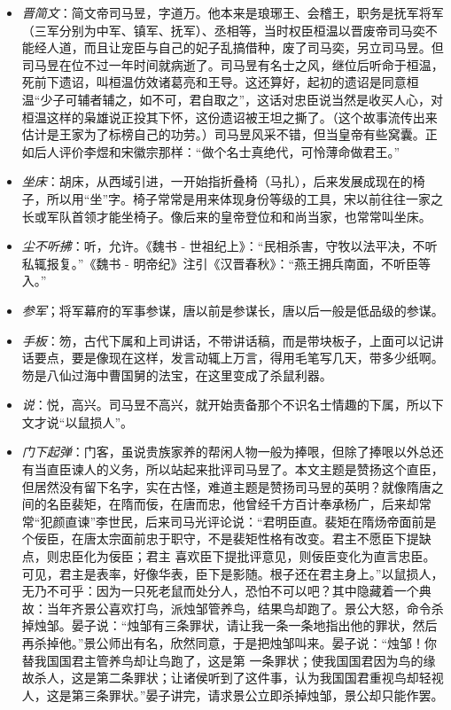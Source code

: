 \documentclass[]{book}
\providecommand{\tightlist}{%
  \setlength{\itemsep}{0pt}\setlength{\parskip}{0pt}}
\begin{document}
\begin{itemize}
\tightlist
\item
  \emph{晋简文}：简文帝司马昱，字道万。他本来是琅琊王、会稽王，职务是抚军将军（三军分别为中军、镇军、抚军）、丞相等，当时权臣桓温以晋废帝司马奕不能经人道，而且让宠臣与自己的妃子乱搞借种，废了司马奕，另立司马昱。但司马昱在位不过一年时间就病逝了。司马昱有名士之风，继位后听命于桓温，死前下遗诏，叫桓温仿效诸葛亮和王导。这还算好，起初的遗诏是同意桓温``少子可辅者辅之，如不可，君自取之''，这话对忠臣说当然是收买人心，对桓温这样的枭雄说正投其下怀，这份遗诏被王坦之撕了。（这个故事流传出来估计是王家为了标榜自己的功劳。）司马昱风采不错，但当皇帝有些窝囊。正如后人评价李煜和宋徽宗那样：``做个名士真绝代，可怜薄命做君王。''
\item
  \emph{坐床}：胡床，从西域引进，一开始指折叠椅（马扎），后来发展成现在的椅子，所以用``坐''字。椅子常常是用来体现身份等级的工具，宋以前往往一家之长或军队首领才能坐椅子。像后来的皇帝登位和和尚当家，也常常叫坐床。
\item
  \emph{尘不听拂}：听，允许。《魏书 -
  世祖纪上》：``民相杀害，守牧以法平决，不听私辄报复。''《魏书 -
  明帝纪》注引《汉晋春秋》：``燕王拥兵南面，不听臣等入。''
\item
  \emph{参军}；将军幕府的军事参谋，唐以前是参谋长，唐以后一般是低品级的参谋。
\item
  \emph{手板}：笏，古代下属和上司讲话，不带讲话稿，而是带块板子，上面可以记讲话要点，要是像现在这样，发言动辄上万言，得用毛笔写几天，带多少纸啊。笏是八仙过海中曹国舅的法宝，在这里变成了杀鼠利器。
\item
  \emph{说}：悦，高兴。司马昱不高兴，就开始责备那个不识名士情趣的下属，所以下文才说``以鼠损人''。
\item
  \emph{门下起弹}：门客，虽说贵族家养的帮闲人物一般为捧哏，但除了捧哏以外总还有当直臣谏人的义务，所以站起来批评司马昱了。本文主题是赞扬这个直臣，但居然没有留下名字，实在古怪，难道主题是赞扬司马昱的英明？就像隋唐之间的名臣裴矩，在隋而佞，在唐而忠，他曾经千方百计奉承杨广，后来却常常``犯颜直谏''李世民，后来司马光评论说：``君明臣直。裴矩在隋炀帝面前是个佞臣，在唐太宗面前忠于职守，不是裴矩性格有改变。君主不愿臣下提缺点，则忠臣化为佞臣；君主
  喜欢臣下提批评意见，则佞臣变化为直言忠臣。可见，君主是表率，好像华表，臣下是影随。根子还在君主身上。''以鼠损人，无乃不可乎：因为一只死老鼠而处分人，恐怕不可以吧？其中隐藏着一个典故：当年齐景公喜欢打鸟，派烛邹管养鸟，结果鸟却跑了。景公大怒，命令杀掉烛邹。晏子说：``烛邹有三条罪状，请让我一条一条地指出他的罪状，然后再杀掉他。''景公师出有名，欣然同意，于是把烛邹叫来。晏子说：``烛邹！你替我国国君主管养鸟却让鸟跑了，这是第
  一条罪状；使我国国君因为鸟的缘故杀人，这是第二条罪状；让诸侯听到了这件事，认为我国国君重视鸟却轻视人，这是第三条罪状。''晏子讲完，请求景公立即杀掉烛邹，景公却只能作罢。
\end{itemize}
\end{document}

